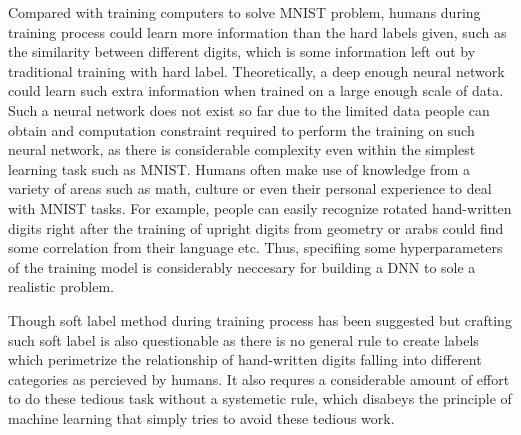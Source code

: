 \documentclass{article}
\begin{document}
Compared with training computers to solve MNIST problem, humans during training process could learn more information than the hard labels given, such as the similarity between different digits, 
which is some information left out by traditional training with hard label. 
Theoretically, a deep enough neural network could learn such extra information when trained on a large enough scale of data. Such a neural network does not exist so far due to the limited data people can obtain and computation constraint required to perform the training on such neural network, as there is considerable complexity even within the simplest learning task such as MNIST. Humans often make use of knowledge from a variety of areas such as math, culture or even their personal experience to deal with MNIST tasks. For example, people can easily recognize rotated hand-written digits right after the training of upright digits from geometry or arabs could find some correlation from their language etc.
Thus, specifiing some hyperparameters of the training model is considerably neccesary for building a DNN to sole a realistic problem.

Though soft label method during training process has been suggested but crafting such soft label is also questionable as there is no general rule to create labels which perimetrize the relationship of hand-written digits falling into different categories as percieved by humans.
It also requres a considerable amount of effort to do these tedious task without a systemetic rule, which disabeys the principle of machine learning that simply tries to avoid these tedious work.






\end{document}
